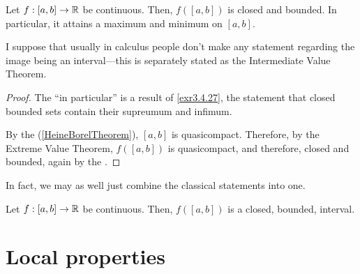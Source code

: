 \begin{crl}\label{ClassicalExtremeValueTheorem}
Let $f:[a,b]\rightarrow \mathbb{R}$ be continuous.  Then, $f([a,b])$ is closed and bounded.  In particular, it attains a maximum and minimum on $[a,b]$.
\begin{rmk}
I suppose that usually in calculus people don't make any statement regarding the image being an interval---this is separately stated as the Intermediate Value Theorem.
\end{rmk}
\begin{proof}
The ``in particular'' is a result of \cref{exr3.4.27}, the statement that closed bounded sets contain their supreumum and infimum.

By the  (\cref{HeineBorelTheorem}), $[a,b]$ is quasicompact.  Therefore, by the Extreme Value Theorem, $f([a,b])$ is quasicompact, and therefore, closed and bounded, again by the .
\end{proof}
\end{crl}

In fact, we may as well just combine the classical statements into one.
\begin{crl}\label{ClassicalIntermediateExtremeValueTheorem}
Let $f:[a,b]\rightarrow \mathbb{R}$ be continuous.  Then, $f([a,b])$ is a closed, bounded, interval.
\end{crl}

\section{Local properties}

